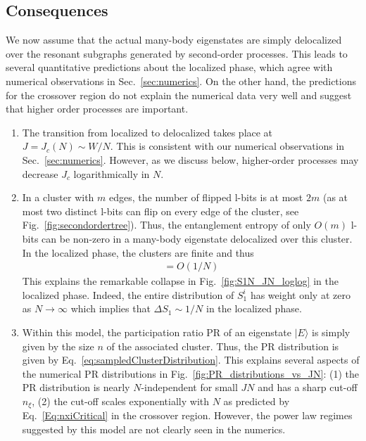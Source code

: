 \documentclass[aps,pra,twocolumn,a4paper,showpacs,superscriptaddress,floatfix,10pt]{revtex4}
\newcommand{\ket}[1]{|#1\rangle}
\begin{document}
\subsection{Consequences}
\label{sub:pt_consequences}

We now assume that the actual many-body eigenstates are simply delocalized over the resonant subgraphs generated by second-order processes. This leads to several quantitative predictions about the localized phase, which agree with numerical observations in Sec.~\ref{sec:numerics}. On the other hand, the predictions for the crossover region do not explain the numerical data very well and suggest that higher order processes are important.

\begin{enumerate}
\item The transition from localized to delocalized takes place at $J = J_c(N) \sim W/N$.
This is consistent with our numerical observations in Sec.~\ref{sec:numerics}.
However, as we discuss below, higher-order processes may decrease $J_c$ logarithmically in $N$.

\item
In a cluster with $m$ edges, the number of flipped l-bits is at most $2m$ (as at most two distinct l-bits can flip on every edge of the cluster, see Fig.~\ref{fig:secondordertree}).
Thus, the entanglement entropy of only $O(m)$ l-bits can be non-zero in a many-body eigenstate delocalized over this cluster.
In the localized phase, the clusters are finite and thus
\begin{align}
	[S_1] = O(1/N)
\end{align}
This explains the remarkable collapse in Fig.~\ref{fig:S1N_JN_loglog} in the localized phase.
Indeed, the entire distribution of $S_1^i$ has weight only at zero as $N \to \infty$ which implies that $\Delta S_1 \sim 1/N$ in the localized phase.

\item
Within this model, the participation ratio PR of an eigenstate $\ket{E}$ is simply given by the size $n$ of the associated cluster.
Thus, the PR distribution is given by Eq.~\eqref{eq:sampledClusterDistribution}.
This explains several aspects of the numerical PR distributions in Fig.~\ref{fig:PR_distributions_vs_JN}: (1) the PR distribution is nearly $N$-independent for small $JN$ and has a sharp cut-off $n_\xi$, (2) the cut-off scales exponentially with $N$ as predicted by Eq.~\eqref{Eq:nxiCritical} in the crossover region.
However, the power law regimes suggested by this model are not clearly seen in the numerics.


\end{enumerate}
\end{document}
